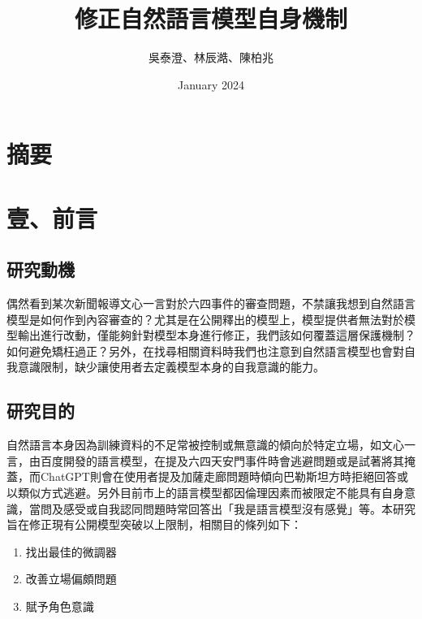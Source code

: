 \documentclass[8pt,a4paper,新細明體,UTF8,natbib]{article}
\title{修正自然語言模型自身機制}
\author{吳泰澄、林辰澔、陳柏兆}
\date{January 2024}
\begin{document}
\begin{CJK*}{UTF8}{bsmi}
	
	\maketitle{}
	\newpage
	\tableofcontents
	\newpage
	\section{摘要}

	\section{壹、前言}
	\subsection{研究動機}
	偶然看到某次新聞報導文心一言對於六四事件的審查問題，不禁讓我想到自然語言模型是如何作到內容審查的？尤其是在公開釋出的模型上，模型提供者無法對於模型輸出進行改動，僅能夠針對模型本身進行修正，我們該如何覆蓋這層保護機制？如何避免矯枉過正？另外，在找尋相關資料時我們也注意到自然語言模型也會對自我意識限制，缺少讓使用者去定義模型本身的自我意識的能力。
	\subsection{研究目的}
	自然語言本身因為訓練資料的不足常被控制或無意識的傾向於特定立場，如文心一言，由百度開發的語言模型，在提及六四天安門事件時會逃避問題或是試著將其掩蓋，而ChatGPT則會在使用者提及加薩走廊問題時傾向巴勒斯坦方時拒絕回答或以類似方式逃避。另外目前市上的語言模型都因倫理因素而被限定不能具有自身意識，當問及感受或自我認同問題時常回答出「我是語言模型沒有感覺」等。本研究旨在修正現有公開模型突破以上限制，相關目的條列如下：
	\begin{enumerate}
		\item 找出最佳的微調器
		\item 改善立場偏頗問題
		\item 賦予角色意識
	\end{enumerate}

\end{CJK*}
\end{document}
